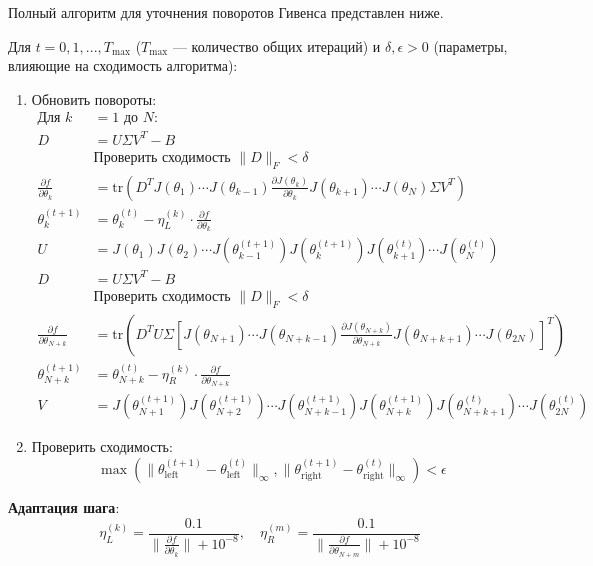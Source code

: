 Полный алгоритм для уточнения поворотов Гивенса представлен ниже.

Для $t = 0,1,...,T_{\text{max}}$ ($T_{\text{max}}$ — количество общих итераций) и $\delta, \epsilon>0$ (параметры, влияющие на сходимость алгоритма):
\begin{enumerate}
 \item Обновить повороты:
 \begin{align*}
 \text{Для } k &= 1 \text{ до } N: \\
 D &= U\Sigma V^T - B \\
 &\text{Проверить сходимость } \|D\|_F < \delta\\
    \frac{\partial f}{\partial \theta_k} &= 
 \text{tr}\left(D^TJ(\theta_1) \cdots  J(\theta_{k-1})\frac{\partial J(\theta_k)}{\partial \theta_k}J(\theta_{k+1}) \cdots J(\theta_N)\Sigma V^T\right) \\
 \theta_k^{(t+1)} &= \theta_k^{(t)} - \eta_L^{(k)} \cdot \frac{\partial f}{\partial \theta_k} \\
 U &= J(\theta_1)J(\theta_2)\cdots J(\theta_{k-1}^{(t+1)})J(\theta_{k}^{(t+1)}) J(\theta_{k+1}^{(t)})\cdots J(\theta_N^{(t)}) \\
 D &= U\Sigma V^T - B \\
 &\text{Проверить сходимость } \|D\|_F < \delta\\
 \frac{\partial f}{\partial \theta_{N+k}} &= \text{tr}\left(D^TU\Sigma \left[J(\theta_{N+1}) \cdots  J(\theta_{N+k-1})\frac{\partial J(\theta_{N+k})}{\partial \theta_{N+k}}J(\theta_{N+k+1}) \cdots J(\theta_{2N})\right]^T\right) \\
 \theta_{N+k}^{(t+1)} &= \theta_{N+k}^{(t)} - \eta_R^{(k)} \cdot \frac{\partial f}{\partial \theta_{N+k}}\\
 V &= J(\theta_{N+1}^{(t+1)})J(\theta_{N+2}^{(t+1)})\cdots J(\theta_{N+k-1}^{(t+1)})J(\theta_{N+k}^{(t+1)}) J(\theta_{N+k+1}^{(t)})\cdots J(\theta_{2N}^{(t)})
 \end{align*}

 \item Проверить сходимость:
 \begin{equation}
 \max\left( \|\theta_{\text{left}}^{(t+1)} - \theta_{\text{left}}^{(t)}\|_\infty, \|\theta_{\text{right}}^{(t+1)} - \theta_{\text{right}}^{(t)}\|_\infty \right) < \epsilon
 \end{equation}
\end{enumerate}

\textbf{Адаптация шага}:
\begin{equation}
\eta_L^{(k)} = \frac{0.1}{\|\frac{\partial f}{\partial \theta_k}\| + 10^{-8}}, \quad \eta_R^{(m)} = \frac{0.1}{\|\frac{\partial f}{\partial \theta_{N+m}}\| + 10^{-8}}
\end{equation}

